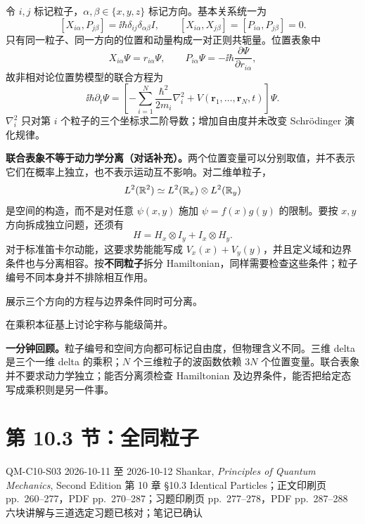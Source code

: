 令 $i,j$ 标记粒子，$\alpha,\beta\in\{x,y,z\}$ 标记方向。基本关系统一为
\begin{equation}
  \boxed{[X_{i\alpha},P_{j\beta}]
    =\ii\hbar\delta_{ij}\delta_{\alpha\beta}I},\qquad
  [X_{i\alpha},X_{j\beta}]=[P_{i\alpha},P_{j\beta}]=0.
\end{equation}
只有同一粒子、同一方向的位置和动量构成一对正则共轭量。位置表象中
\begin{equation}
  X_{i\alpha}\Psi=r_{i\alpha}\Psi,\qquad
  P_{i\alpha}\Psi=-\ii\hbar\frac{\partial\Psi}{\partial r_{i\alpha}},
\end{equation}
故非相对论位置势模型的联合方程为
\begin{equation}
  \boxed{\ii\hbar\partial_t\Psi
   =\left[-\sum_{i=1}^{N}\frac{\hbar^2}{2m_i}\nabla_i^2
     +V(\mathbf r_1,\ldots,\mathbf r_N,t)\right]\Psi}.
\end{equation}
$\nabla_i^2$ 只对第 $i$ 个粒子的三个坐标求二阶导数；增加自由度并未改变 Schr\"odinger 演化规律。

\textbf{联合表象不等于动力学分离（对话补充）。}两个位置变量可以分别取值，并不表示它们在概率上独立，也不表示运动互不影响。对二维单粒子，
\begin{equation}
  L^2(\mathbb{R}^2)\simeq L^2(\mathbb{R}_x)\otimes L^2(\mathbb{R}_y)
\end{equation}
是空间的构造，而不是对任意 $\psi(x,y)$ 施加 $\psi=f(x)g(y)$ 的限制。要按 $x,y$ 方向拆成独立问题，还须有
\begin{equation}
  H=H_x\otimes I_y+I_x\otimes H_y.
\end{equation}
对于标准笛卡尔动能，这要求势能能写成 $V_x(x)+V_y(y)$，并且定义域和边界条件也与分离相容。按\textbf{不同粒子}拆分 Hamiltonian，同样需要检查这些条件；粒子编号不同本身并不排除相互作用。

 展示三个方向的方程与边界条件同时可分离。

 在乘积本征基上讨论宇称与能级简并。

\textbf{一分钟回顾。}粒子编号和空间方向都可标记自由度，但物理含义不同。三维 delta 是三个一维 delta 的乘积；$N$ 个三维粒子的波函数依赖 $3N$ 个位置变量。联合表象并不要求动力学独立；能否分离须检查 Hamiltonian 及边界条件，能否把给定态写成乘积则是另一件事。

\section{第 10.3 节：全同粒子}
\label{section:QM-C10-S03}
\studymeta
  {QM-C10-S03}
  {2026-10-11 至 2026-10-12}
  {Shankar, \textit{Principles of Quantum Mechanics}, Second Edition}
  {第 10 章 \S 10.3 Identical Particles；正文印刷页 pp.~260--277，PDF pp.~270--287；习题印刷页 pp.~277--278，PDF pp.~287--288}
  {六块讲解与三道选定习题已核对；笔记已确认}


